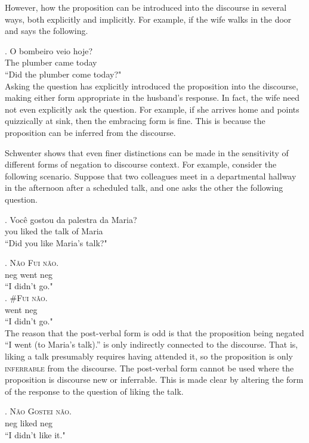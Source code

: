However, how the proposition can be introduced into the discourse in several ways, both explicitly and implicitly. For example, if the wife walks in the door and says the following.

\exg.  O bombeiro veio hoje?\\
       The plumber came today\\
         ``Did the plumber come today?"\\

Asking the question has explicitly introduced the proposition into the discourse, making either form appropriate in the husband's response. In fact, the wife need not even explicitly ask the question. For example, if she arrives home and points quizzically at sink, then the embracing form is fine. This is because the proposition can be inferred from the discourse.

Schwenter shows that even finer distinctions can be made in the sensitivity of different forms of negation to discourse context. For example, consider the following scenario. Suppose that two colleagues meet in a departmental hallway in the afternoon after a scheduled talk, and one asks the other the following question.

\exg. Voc{\^e} gostou da palestra da Maria?\\
	 you liked the talk of Maria\\
	 ``Did you like Maria's talk?"

\exg. \textsc{\color{blue}N{\~a}o} \textsc{\color{blue}Fui} \textsc{\color{blue}n{\~a}o}.\\
	 neg went neg\\
	 ``I didn't go."\\

\exg. \#\textsc{\color{green}Fui} \textsc{\color{green}n{\~a}o}.\\
	  went neg\\
	 ``I didn't go."\\

The reason that the post-verbal form is odd is that the proposition being negated ``I went (to Maria's talk).'' is only indirectly connected to the discourse. That is, liking a talk presumably requires having attended it, so the proposition is only \textsc{inferrable} from the discourse. The post-verbal form cannot be used where the proposition is discourse new or inferrable. This is made clear by altering the form of the response to the question of liking the talk.

\exg. \textsc{\color{blue}N{\~a}o} \textsc{\color{blue}Gostei} \textsc{\color{blue}n{\~a}o}.\\
	 neg liked neg\\
	 ``I didn't like it."\\

